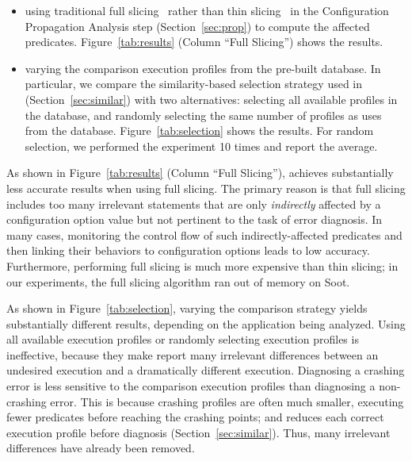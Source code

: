 \begin{itemize}
\item using traditional full slicing~\cite{Horwitz:1988} rather
than thin slicing~\cite{Sridharan:2007} in the Configuration
Propagation Analysis step (Section~\ref{sec:prop}) to compute the affected predicates.
Figure~\ref{tab:results}  (Column ``Full Slicing'') shows the results.
\item varying the comparison execution profiles from the pre-built database.
In particular, we compare the similarity-based selection strategy used in \ourtool
 (Section~\ref{sec:similar}) with two alternatives: selecting
all available profiles in the database, and
randomly selecting the same number of profiles as \ourtool uses from the database.
Figure~\ref{tab:selection} shows the results. For random selection, we
performed the experiment 10 times and report the average.
\end{itemize}


As shown in Figure~\ref{tab:results}  (Column ``Full Slicing''),
\ourtool achieves substantially less accurate results when using
full slicing. The primary reason is that full slicing includes
too many irrelevant statements that are only \textit{indirectly} affected by
a configuration option value but not pertinent to the task of
error diagnosis. In many cases, monitoring the control flow
of such indirectly-affected predicates and then linking their
behaviors to configuration options leads to low accuracy. Furthermore,
performing full slicing is much more expensive than thin slicing; in
our experiments, the full slicing algorithm ran out of
memory on Soot.



As shown in Figure~\ref{tab:selection}, varying the comparison
strategy yields substantially different results,
depending on the application being analyzed.
Using all available execution profiles or randomly
selecting execution profiles is ineffective, because
they make \ourtool report many irrelevant
differences between an undesired
execution and a dramatically different execution.
Diagnosing a crashing error is less sensitive 
to the comparison execution profiles than diagnosing a non-crashing error.
This is because crashing profiles are often much smaller, executing
fewer predicates before reaching the crashing points; and \ourtool
reduces each correct execution profile before diagnosis (Section~\ref{sec:similar}).
Thus, many irrelevant differences have already been removed.




